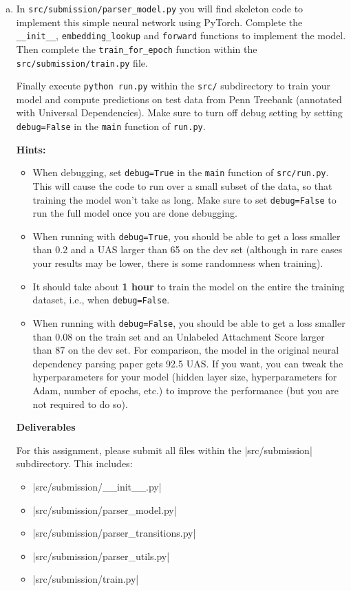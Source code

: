 \begin{enumerate}[(a)]
    \item {} In \texttt{src/submission/parser\_model.py} you will find skeleton code to implement this simple neural network using PyTorch. Complete the \texttt{\_\_init\_\_}, \texttt{embedding\_lookup} and \texttt{forward} functions to implement the model. Then complete the \texttt{train\_for\_epoch} function within the \texttt{src/submission/train.py} file. \newline
   
    Finally execute \texttt{python run.py} within the \texttt{src/} subdirectory to train your model and compute predictions
    on test data from Penn Treebank (annotated with Universal Dependencies). Make sure to turn off debug setting by setting \texttt{debug=False} in the \texttt{main} function of \texttt{run.py}.
    
    \textbf{Hints:}
    \begin{itemize}
        \item
            When debugging, set \texttt{debug=True} in the \texttt{main} function of \texttt{src/run.py}. This will cause the code to run over a small subset of the data, so that training the model won't take as long. Make sure to set \texttt{debug=False} to run the full model once you are done debugging.

        \item
            When running with \texttt{debug=True}, you should be able to get a loss smaller than 0.2 and a UAS larger than 65 on the dev set (although in rare cases your results may be lower, there is some randomness when training).
            
        \item It should take about \textbf{1 hour} to train the model on the entire the training dataset, i.e., when \texttt{debug=False}.
        
        \item When running with \texttt{debug=False}, you should be able to get a loss smaller than 0.08 on the train set and an Unlabeled Attachment Score larger than 87 on the dev set. For comparison, the model in the original neural dependency parsing paper gets 92.5 UAS. If you want, you can tweak the hyperparameters for your model (hidden layer size, hyperparameters for Adam, number of epochs, etc.) to improve the performance (but you are not required to do so).
    \end{itemize}
    \clearpage

    \textbf{Deliverables}

    For this assignment, please submit all files within the |src/submission| subdirectory.  This includes:
    \begin{itemize}
        \item |src/submission/__init__.py|
        \item |src/submission/parser_model.py|
        \item |src/submission/parser_transitions.py|
        \item |src/submission/parser_utils.py|
        \item |src/submission/train.py|
    \end{itemize}   
\end{enumerate}